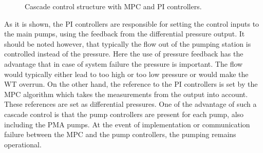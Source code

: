 \begin{figure}[H]
\centering
 
\caption{Cascade control structure with MPC and PI controllers.}
\label{fig:control_structure}
\end{figure}

As it is shown, the PI controllers are responsible for setting the control inputs to the main pumps, using the feedback from the differential pressure output. It should be noted however, that typically the flow out of the pumping station is controlled instead of the pressure. Here the use of pressure feedback has the advantage that in case of system failure the pressure is important. The flow would typically either lead to too high or too low pressure or would make the WT overrun. On the other hand, the reference to the PI controllers is set by the MPC algorithm which takes the measurements from the output into account. These references are set as differential pressures. One of the advantage of such a cascade control is that the pump controllers are present for each pump, also including the PMA pumps. At the event of implementation or communication failure between the MPC and the pump controllers, the pumping remains operational. 
 



